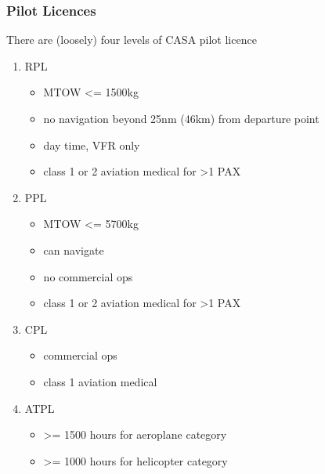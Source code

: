 \begin{frame}
\frametitle{Pilot Licences}
\begin{block}{There are (loosely) four levels of CASA pilot licence}
\begin{enumerate}
\item RPL
  \begin{itemize}
  \item \tiny{MTOW <= 1500kg}
  \item \tiny{no navigation beyond 25nm (46km) from departure point}
  \item \tiny{day time, VFR only}
  \item \tiny{class 1 or 2 aviation medical for >1 PAX}
  \end{itemize}
\item PPL
  \begin{itemize}
  \item \tiny{MTOW <= 5700kg}
  \item \tiny{can navigate}
  \item \tiny{no commercial ops}
  \item \tiny{class 1 or 2 aviation medical for >1 PAX}
  \end{itemize}
\item CPL
  \begin{itemize}
  \item \tiny{commercial ops}
  \item \tiny{class 1 aviation medical}
  \end{itemize}
\item ATPL
  \begin{itemize}
  \item \tiny{>= 1500 hours for aeroplane category}
  \item \tiny{>= 1000 hours for helicopter category}
  \end{itemize}
\end{enumerate}
\end{block}
\end{frame}
